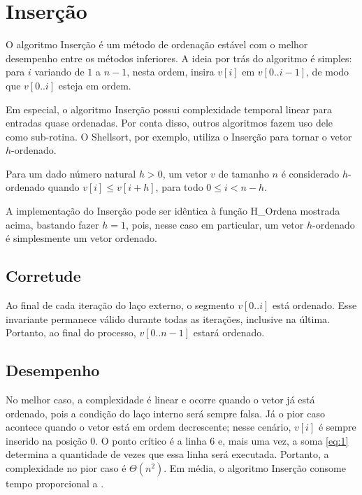 \section{Inserção}
O algoritmo Inserção é um método de ordenação estável com o melhor desempenho entre os métodos inferiores. A ideia por trás do algoritmo é simples: para $i$ variando de $1$ a $n - 1$, nesta ordem, insira $v[i]$ em $v[0..i - 1]$, de modo que $v[0..i]$ esteja em ordem.

Em especial, o algoritmo Inserção possui complexidade temporal linear para entradas quase ordenadas. Por conta disso, outros algoritmos fazem uso dele como sub-rotina. O Shellsort, por exemplo, utiliza o Inserção para tornar o vetor $h$-ordenado.

\begin{definition}
Para um dado número natural $h > 0$, um vetor $v$ de tamanho $n$ é considerado $h$-ordenado quando $v[i] \leq v[i + h]$, para todo $0 \leq i < n - h$.
\end{definition}



A implementação do Inserção pode ser idêntica à função H\_Ordena mostrada acima, bastando fazer $h = 1$, pois, nesse caso em particular, um vetor $h$-ordenado é simplesmente um vetor ordenado.



\subsection*{Corretude}
Ao final de cada iteração do laço externo, o segmento $v[0..i]$ está ordenado. Esse invariante permanece válido durante todas as iterações, inclusive na última. Portanto, ao final do processo, $v[0..n - 1]$ estará ordenado.

\subsection*{Desempenho}
No melhor caso, a complexidade é linear e ocorre quando o vetor já está ordenado, pois a condição do laço interno será sempre falsa. Já o pior caso acontece quando o vetor está em ordem decrescente; nesse cenário, $v[i]$ é sempre inserido na posição $0$. O ponto crítico é a linha 6 e, mais uma vez, a soma \ref{eq:1} determina a quantidade de vezes que essa linha será executada. Portanto, a complexidade no pior caso é $\Theta(n^2)$. Em média, o algoritmo Inserção consome tempo proporcional a .
